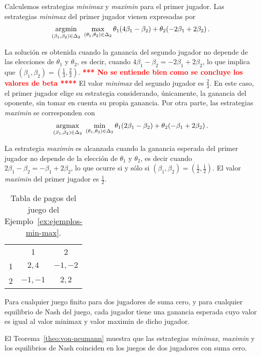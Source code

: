 Calculemos estrategias \textit{minimax} y \textit{maximin} para el primer jugador. Las estrategias \textit{minimax} del primer jugador vienen expresadas por
\begin{alignat}{1}
\operatorname*{\arg\!\min}_{(\beta_1, \beta_2) \in \Delta_2 }\ {\max_{(\theta_1, \theta_2) \in \Delta_2}
{\theta_1(4\beta_1 -\beta_2) + \theta_2(-2\beta_1 + 2\beta_2)}} \,.
\end{alignat}

La solución es obtenida cuando la ganancia del segundo jugador no depende de las elecciones de $\theta_1$ y $\theta_2$, es decir, cuando $4\beta_1 - \beta_2 = -2\beta_1 + 2\beta_2$, lo que implica que $(\beta_1, \beta_2) = \left(\frac{1}{3}, \frac{2}{3} \right)$. 
\textcolor{red}{\bf **** No se entiende bien como se concluye los valores de beta ****}
El valor \textit{minimax} del segundo jugador es $\frac{2}{3}$. En este caso, el primer jugador elige su estrategia considerando, únicamente, la ganancia del oponente, sin tomar en cuenta su propia ganancia.
Por otra parte, las estrategias \textit{maximin} se corresponden con
\begin{alignat}{1}
\operatorname*{\arg\!\max}_{(\beta_1, \beta_2) \in \Delta_2 }\ {\min_{(\theta_1, \theta_2) \in \Delta_2}
{\theta_1(2\beta_1 -\beta_2) + \theta_2(-\beta_1 + 2\beta_2)}} \,.
\end{alignat}

La estrategia \textit{maximin} es alcanzada cuando la ganancia esperada del primer jugador no depende de la elección de $\theta_1$ y $\theta_2$, es decir cuando $2\beta_1 - \beta_2 = -\beta_1 + 2\beta_2$, lo que ocurre si y sólo si $(\beta_1, \beta_2) = \left(\frac{1}{2}, \frac{1}{2}\right)$. El valor \textit{maximin} del primer jugador es $\frac{1}{2}$.

\begin{table}[t]
\begin{center}
\caption{Tabla de pagos del juego del Ejemplo~\ref{ex:ejemplos-min-max}.}
\label{table:ejemplos-min-max}
\begin{tabular}{ r | c | c |}
 \multicolumn{1}{c}{} & \multicolumn{1}{c}{1} & \multicolumn{1}{c}{2}  \\ \cline{2-3}
 1 & $2, 4$ & $-1, -2$ \\ \cline{2-3}
 2 & $-1, -1$ & $2, 2$ \\ \cline{2-3}
\end{tabular}
\end{center}
\end{table}

\begin{theorem}
\label{theo:von-neumann}
Para cualquier juego finito para dos jugadores de suma cero, y para cualquier equilibrio de Nash del juego, cada jugador tiene una ganancia esperada cuyo valor es igual al valor minimax y valor maximin de dicho jugador. \end{theorem}

El Teorema~\ref{theo:von-neumann} muestra que las estrategias \textit{minimax}, \textit{maximin} y los equilibrios de Nash coinciden en los juegos de dos jugadores con suma cero.